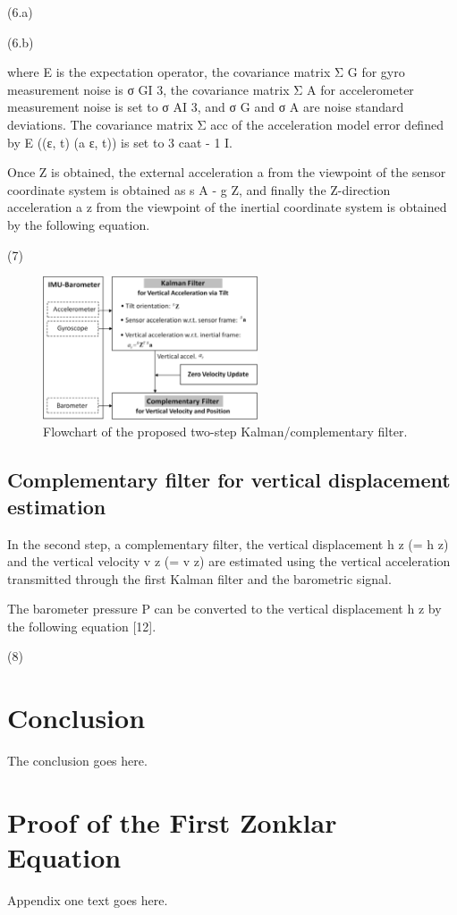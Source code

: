 \documentclass[10pt,journal,compsoc]{IEEEtran}
\begin{document}
(6.a)

(6.b)

where E is the expectation operator, the covariance matrix Σ G for gyro
measurement noise is σ GI 3, the covariance matrix Σ A for accelerometer
measurement noise is set to σ AI 3, and σ G and σ A are noise standard
deviations. The covariance matrix Σ acc of the acceleration model error defined
by E ((ε, t) (a ε, t)) is set to 3 caat - 1 I.

Once Z is obtained, the external acceleration a from the viewpoint of the
sensor coordinate system is obtained as s A - g Z, and finally the Z-direction
acceleration a z from the viewpoint of the inertial coordinate system is
obtained by the following equation.

(7)


\begin{figure}[!t]
\centering
\includegraphics[width=2.5in]{fig1}
    \caption{Flowchart of the proposed two-step Kalman/complementary filter.}
\label{fig1}
\end{figure}

\subsection{Complementary filter for vertical displacement estimation}


In the second step, a complementary filter, the vertical displacement h z (= h
z) and the vertical velocity v z (= v z) are estimated using the vertical
acceleration transmitted through the first Kalman filter and the barometric
signal.

The barometer pressure P can be converted to the vertical displacement h z by
the following equation [12].

(8)

\section{Conclusion}
The conclusion goes here.

\appendices
\section{Proof of the First Zonklar Equation}
Appendix one text goes here.
\end{document}

